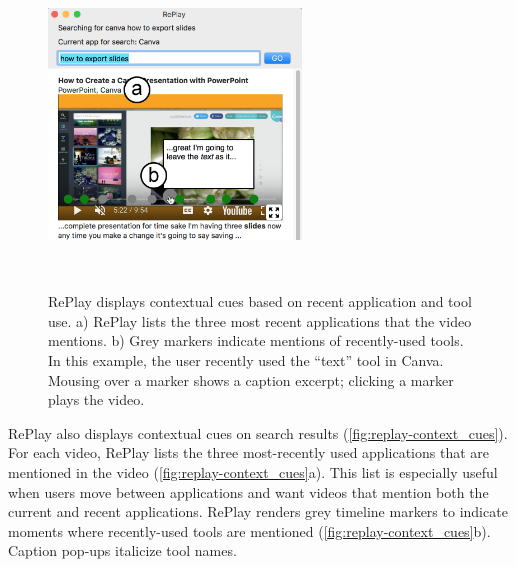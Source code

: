 \begin{figure}[t!]
\centering
  \includegraphics[width=0.6\textwidth]{replay/figures/context_cues.png}
  \caption[RePlay displays contextual cues based on recent application and tool use. a) RePlay lists the three most recent applications that the video mentions. b) Grey markers indicate mentions of recently-used tools. Mousing over a marker shows a caption excerpt; clicking a marker plays the video.]{RePlay displays contextual cues based on recent application and tool use. a) RePlay lists the three most recent applications that the video mentions. b) Grey markers indicate mentions of recently-used tools. In this example, the user recently used the ``text'' tool in Canva. Mousing over a marker shows a caption excerpt; clicking a marker plays the video. }~\label{fig:replay-context_cues}
\end{figure}

RePlay also displays contextual cues \cite{Ekstrand2011} on search results (\autoref{fig:replay-context_cues}). For each video, RePlay lists the three most-recently used applications that are mentioned in the video (\autoref{fig:replay-context_cues}a). This list is especially useful when users move between applications and want videos that mention both the current and recent applications. RePlay renders grey timeline markers to indicate moments where recently-used tools are mentioned (\autoref{fig:replay-context_cues}b). Caption pop-ups italicize tool names.


